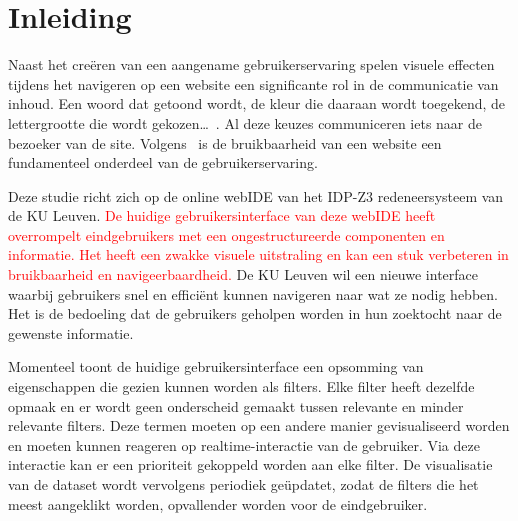 \section{Inleiding}%
\label{sec:inleiding}

Naast het creëren van een aangename gebruikerservaring spelen visuele effecten tijdens het navigeren op een website een significante rol in de communicatie van inhoud. Een woord dat getoond wordt, de kleur die daaraan wordt toegekend, de lettergrootte die wordt gekozen…~\autocite{bordbar2016}. Al deze keuzes communiceren iets naar de bezoeker van de site. Volgens~\textcite{Lee2012} is de bruikbaarheid van een website een fundamenteel onderdeel van de gebruikerservaring. 

Deze studie richt zich op de online webIDE van het IDP-Z3 redeneersysteem van de KU Leuven. \textcolor{red}{De huidige gebruikersinterface van deze webIDE heeft overrompelt eindgebruikers met een ongestructureerde componenten en informatie. Het heeft een zwakke visuele uitstraling en kan een stuk verbeteren in bruikbaarheid en navigeerbaardheid.} De KU Leuven wil een nieuwe interface waarbij gebruikers snel en efficiënt kunnen navigeren naar wat ze nodig hebben. Het is de bedoeling dat de gebruikers geholpen worden in hun zoektocht naar de gewenste informatie.


Momenteel toont de huidige gebruikersinterface een opsomming van eigenschappen die gezien kunnen worden als filters. Elke filter heeft dezelfde opmaak en er wordt geen onderscheid gemaakt tussen relevante en minder relevante filters. Deze termen moeten op een andere manier gevisualiseerd worden en moeten kunnen reageren op realtime-interactie van de gebruiker. Via deze interactie kan er een prioriteit gekoppeld worden aan elke filter. De visualisatie van de dataset wordt vervolgens periodiek geüpdatet, zodat de filters die het meest aangeklikt worden, opvallender worden voor de eindgebruiker.


